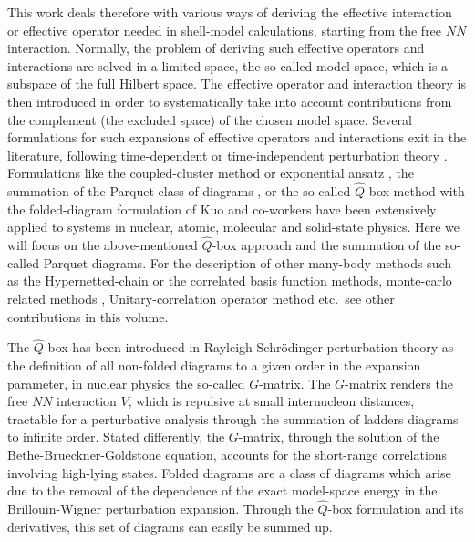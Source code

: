 This work deals therefore with various ways of 
deriving the effective
interaction or effective operator needed
in shell-model calculations, starting from the
free $NN$  interaction.
Normally, the problem of deriving such effective operators and interactions are solved
in a limited space, the so-called model space, which is a subspace of the
full Hilbert space. The effective operator and interaction
theory is then introduced in order to
systematically take into account contributions from the complement
(the excluded space) of the chosen model space. Several formulations
for such expansions of effective operators and interactions exit in the literature, following
time-dependent or time-independent
perturbation theory \cite{so95,brandow67,ko90,hko95,lm85,so84}.  
Formulations like the coupled-cluster
method or exponential ansatz 
\cite{lm85,arponen97,lk72a,lk72b,zabolitzky74,klz78,ticcm,hm98},
the summation of the Parquet class of diagrams 
\cite{dm64,nozieres,babu,jls82,br86,scalapino,ym96,dya97}, or
the so-called $\hat{Q}$-box method with the folded-diagram
formulation of Kuo and co-workers \cite{ko90,hko95} have been extensively
applied to systems in nuclear, atomic, molecular and solid-state physics.
Here we will focus on the above-mentioned $\hat{Q}$-box approach
and the summation of the so-called Parquet diagrams. 
For the description of other many-body methods such as the Hypernetted-chain or the 
correlated basis function \cite{adelchi98} methods, monte-carlo related 
methods
\cite{david97,vijay}, Unitary-correlation operator method \cite{so84} etc.\ 
see other contributions in this volume.

The
$\hat{Q}$-box has been introduced in Rayleigh-Schr\"odinger perturbation
theory as the definition of all non-folded diagrams to a given order in
the expansion parameter, in nuclear physics the so-called $G$-matrix.
The $G$-matrix renders the free $NN$  interaction $V$, which
is repulsive at small internucleon distances,  tractable
for a perturbative analysis through the summation of ladders diagrams
to infinite order. Stated differently, the $G$-matrix, through the
solution of the Bethe-Brueckner-Goldstone equation, accounts for the
short-range correlations involving high-lying states.
Folded diagrams are a class of diagrams which arise
due to the removal of the dependence of the exact model-space energy
in the Brillouin-Wigner perturbation expansion. Through the $\hat{Q}$-box
formulation and its derivatives, this set of diagrams can easily be summed
up. 

